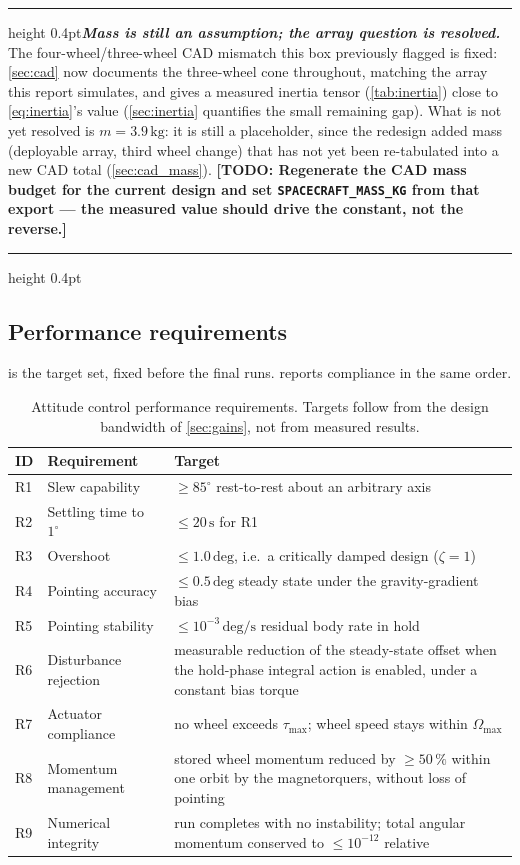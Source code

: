 \documentclass[conference,10pt,a4paper]{IEEEtran}
\newcommand{\remarkrule}{\par\nobreak\vspace{2pt}%
  \hrule height 0.4pt\vspace{4pt}\nobreak}
\newenvironment{cautionbox}[1][Caveat]
  {\par\medskip\remarkrule\noindent\small\textbf{\textit{#1.}}\ \ignorespaces}
  {\par\vspace{3pt}\hrule height 0.4pt\par\medskip\ignorespacesafterend}
\newcommand{\TODO}[1]{\textbf{[TODO: #1]}}
\newcommand{\TODO}[1]{}
\newcommand{\unit}[1]{\ensuremath{\,\mathrm{#1}}}
\begin{document}
\begin{cautionbox}[Mass is still an assumption; the array question is resolved]
The four-wheel/three-wheel CAD mismatch this box previously flagged is fixed:
\cref{sec:cad} now documents the three-wheel cone throughout, matching the
array this report simulates, and gives a measured inertia tensor
(\cref{tab:inertia}) close to \cref{eq:inertia}'s value (\cref{sec:inertia}
quantifies the small remaining gap). What is not yet resolved is
$m=3.9\unit{kg}$: it is still a placeholder, since the redesign added mass
(deployable array, third wheel change) that has not yet been re-tabulated
into a new CAD total (\cref{sec:cad_mass}). \TODO{Regenerate the CAD mass
budget for the current design and set \texttt{SPACECRAFT\_MASS\_KG} from
that export --- the measured value should drive the constant, not the
reverse.}
\end{cautionbox}

\subsection{Performance requirements}

 is the target set, fixed before the final runs.
 reports compliance in the same order.

\begin{table}[!t]
\centering
\caption{Attitude control performance requirements. Targets follow from the
design bandwidth of \cref{sec:gains}, not from measured results.}
\label{tab:requirements}
\footnotesize
\begin{tabularx}{\textwidth}{@{}p{}p{}X@{}}
\toprule
\textbf{ID} & \textbf{Requirement} & \textbf{Target} \\
\midrule
R1 & Slew capability            & $\ge 85^\circ$ rest-to-rest about an arbitrary axis \\
R2 & Settling time to $1^\circ$ & $\le 20\unit{s}$ for R1 \\
R3 & Overshoot                  & $\le 1.0\unit{deg}$, i.e.\ a critically damped design ($\zeta=1$) \\
R4 & Pointing accuracy          & $\le 0.5\unit{deg}$ steady state under the gravity-gradient bias \\
R5 & Pointing stability         & $\le 10^{-3}\unit{deg/s}$ residual body rate in hold \\
R6 & Disturbance rejection      & measurable reduction of the steady-state offset when the hold-phase integral action is enabled, under a constant bias torque \\
R7 & Actuator compliance        & no wheel exceeds $\tau_\text{max}$; wheel speed stays within $\Omega_\text{max}$ \\
R8 & Momentum management        & stored wheel momentum reduced by $\ge50\,\%$ within one orbit by the magnetorquers, without loss of pointing \\
R9 & Numerical integrity        & run completes with no instability; total angular momentum conserved to $\le10^{-12}$ relative \\
\bottomrule
\end{tabularx}
\end{table}
\end{document}
